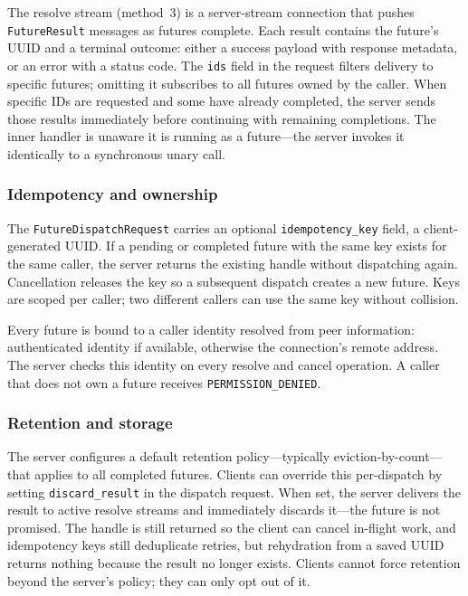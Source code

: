 \documentclass[10pt,onecolumn]{article}
\begin{document}
The resolve stream (method~3) is a server-stream connection that pushes \texttt{FutureResult} messages as futures complete. Each result contains the future's UUID and a terminal outcome: either a success payload with response metadata, or an error with a status code. The \texttt{ids} field in the request filters delivery to specific futures; omitting it subscribes to all futures owned by the caller. When specific IDs are requested and some have already completed, the server sends those results immediately before continuing with remaining completions. The inner handler is unaware it is running as a future---the server invokes it identically to a synchronous unary call.

\subsubsection{Idempotency and ownership}

The \texttt{FutureDispatchRequest} carries an optional \texttt{idempotency\_key} field, a client-generated UUID. If a pending or completed future with the same key exists for the same caller, the server returns the existing handle without dispatching again. Cancellation releases the key so a subsequent dispatch creates a new future. Keys are scoped per caller; two different callers can use the same key without collision.

Every future is bound to a caller identity resolved from peer information: authenticated identity if available, otherwise the connection's remote address. The server checks this identity on every resolve and cancel operation. A caller that does not own a future receives \texttt{PERMISSION\_DENIED}.

\subsubsection{Retention and storage}

The server configures a default retention policy---typically eviction-by-count---that applies to all completed futures. Clients can override this per-dispatch by setting \texttt{discard\_result} in the dispatch request. When set, the server delivers the result to active resolve streams and immediately discards it---the future is not promised. The handle is still returned so the client can cancel in-flight work, and idempotency keys still deduplicate retries, but rehydration from a saved UUID returns nothing because the result no longer exists. Clients cannot force retention beyond the server's policy; they can only opt out of it.
\end{document}
